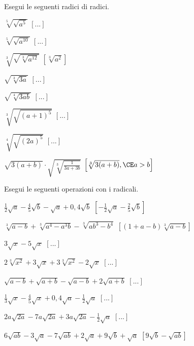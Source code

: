 \begin{esercizio}[\Ast]
 \label{ese:2.48}
Esegui le seguenti radici di radici.
 \begin{multicols}{3}
 \begin{enumeratea}
 \item $\sqrt[5]{\sqrt{a^5}}$
  \hfill $\left[...\right]$
 \item $\sqrt[5]{\sqrt{a^{10}}}$
  \hfill $\left[...\right]$
 \item $\sqrt[3]{\sqrt{\sqrt[3]{a^{12}}}}$
  \hfill $\left[\sqrt[3]{a^2}\right]$
 \item $\sqrt{\sqrt[3]{3a}}$
  \hfill $\left[...\right]$
 \item $\sqrt{\sqrt[4]{3ab}}$
  \hfill $\left[...\right]$
 \item $\sqrt[3]{\sqrt{(a+1)^5}}$
  \hfill $\left[...\right]$
 \item $\sqrt[4]{\sqrt{(2a)^5}}$
  \hfill $\left[...\right]$
 \item $\sqrt{3(a+b)}\cdot \sqrt{\sqrt[3]{\frac 1{3a+3b}}}$
  \hfill $\left[\sqrt[3]{3(a+b)}, \CE a>b\right]$
 \end{enumeratea}
 \end{multicols}
\end{esercizio}

\begin{esercizio}[\Ast]
 \label{ese:2.52}
Esegui le seguenti operazioni con i radicali.
 \begin{enumeratea}
 \item $\frac 1 2\sqrt a-\frac 4 5\sqrt b-\sqrt a+0,4\sqrt b$
  \hfill $\left[-\frac 1 2\sqrt a-\frac 2 5\sqrt b\right]$
 \item $\sqrt[3]{a-b}+\sqrt[3]{a^4-a^3b}-\sqrt[3]{{ab}^3-b^4}$
  \hfill $\left[(1+a-b)\sqrt[3]{a-b}\right]$
 \item $3\sqrt x-5\sqrt x$
  \hfill $\left[...\right]$
 \item $2\sqrt[3]{x^2}+3\sqrt x+3\sqrt[3]{x^2}-2\sqrt x$
  \hfill $\left[...\right]$
 \item $\sqrt{a-b}+\sqrt{a+b}-\sqrt{a-b}+2\sqrt{a+b}$
  \hfill $\left[...\right]$
 \item $\frac 1 3\sqrt x-\frac 4 5\sqrt x+0,4\sqrt a-\frac 1 2\sqrt a$
  \hfill $\left[...\right]$
 \item $2a\sqrt{2a}-7a\sqrt{2a}+3a\sqrt{2a}-\frac 1 2\sqrt a$
  \hfill $\left[...\right]$
 \item $6\sqrt{{ab}}-3\sqrt a-7\sqrt{{ab}}+2\sqrt a+9\sqrt b+\sqrt a$
  \hfill $\left[9\sqrt b-\sqrt{ab}\right]$
 \end{enumeratea}
\end{esercizio}

